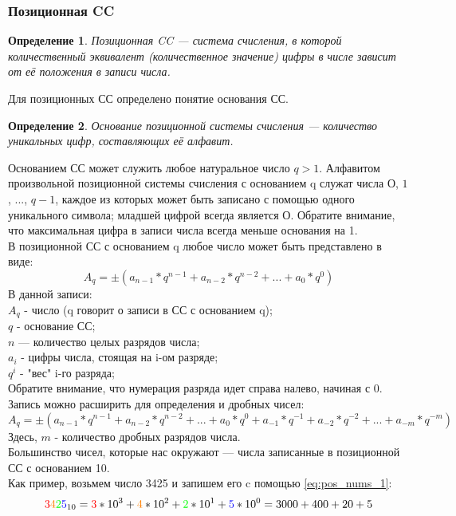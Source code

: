 \documentclass[12pt]{article}
\newtheorem{definition}{Определение}[section]
\theoremstyle{problem_style}
\begin{document}
\subsubsection{Позиционная CC}
\begin{definition}
Позиционная CC — система счисления, в которой количественный эквивалент (количественное значение) цифры в числе зависит от её положения в записи числа.
\end{definition}
Для позиционных СС определено понятие основания СС.
\begin{definition}
Основание позиционной системы счисления — количество уникальных цифр, составляющих её алфавит.
\end{definition}
Основанием СС может служить любое натуральное число $q > 1$. Алфавитом произвольной позиционной системы счисления с основанием q служат числа $О$, $1$, ..., $q-1$, каждое из которых может быть записано с помощью одного уникального символа; младшей цифрой всегда является О. Обратите внимание, что максимальная цифра в записи числа всегда меньше основания на 1.\\
В позиционной СС с основанием q любое число может быть представлено в виде:
\begin{equation}
A_q = \pm (a_{n-1}*q^{n-1} + a_{n-2}*q^{n-2} + ... + a_{0}*q^{0}) \label{eq:pos_nums_1}
\end{equation}
В данной записи:\\
$A_q$ - число (q говорит о записи в СС с основанием q);\\
$q$ - основание СС;\\
$n$ — количество целых разрядов числа;\\
$a_i$ - цифры числа, стоящая на i-ом разряде;\\
$q^i$ - "вес" i-го разряда;\\
Обратите внимание, что нумерация разряда идет справа налево, начиная с 0.\\
Запись можно расширить для определения и дробных чисел:
\begin{equation}
A_q = \pm (a_{n-1}*q^{n-1} + a_{n-2}*q^{n-2} + ... + a_{0}*q^{0} + a_{-1}*q^{-1} + a_{-2}*q^{-2} + ... + a_{-m}*q^{-m}) \label{eq:pos_nums_2}
\end{equation}
Здесь, $m$ - количество дробных разрядов числа.\\
Большинство чисел, которые нас окружают — числа записанные в позиционной СС с основанием 10.\\ Как пример, возьмем число 3425 и запишем его c помощью \autoref{eq:pos_nums_1}:
\[
\textcolor{red}{3}\textcolor{orange}{4}\textcolor{green}{2}\textcolor{blue}{5}_{10} = \textcolor{red}{3} * 10^3 + \textcolor{orange}{4} * 10^2 + \textcolor{green}{2} * 10^1 + \textcolor{blue}{5} * 10^0 = 3000 + 400 + 20 + 5
\]
\end{document}
